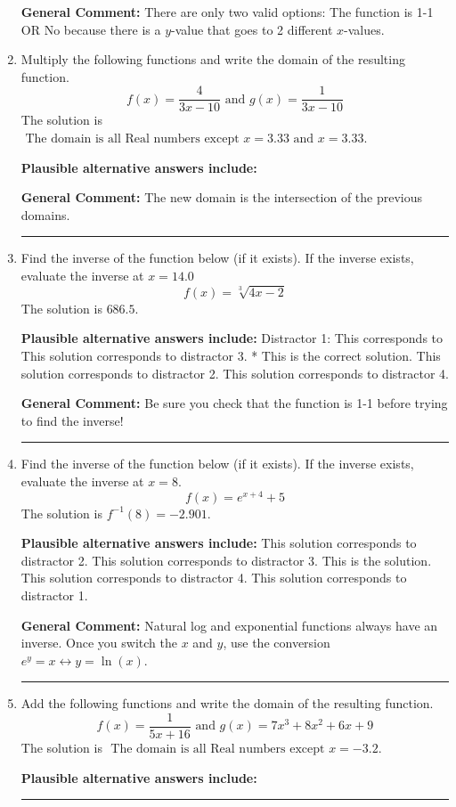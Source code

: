 \documentclass{extbook}[14pt]
\newcommand{\litem}[1]{\item #1

\rule{\textwidth}{0.4pt}}
\begin{document}
\begin{enumerate}
{\textbf{General Comment:} There are only two valid options: The function is 1-1 OR No because there is a $y$-value that goes to 2 different $x$-values.
}
\litem{
Multiply the following functions and write the domain of the resulting function.
\[ f(x) = \frac{4}{3x-10} \text{ and } g(x) = \frac{1}{3x-10} \]The solution is \( \text{ The domain is all Real numbers except } x = 3.33 \text{ and } x = 3.33 \).\begin{enumerate}[label=\Alph*.]
\textbf{Plausible alternative answers include:}




\end{enumerate}

\textbf{General Comment:} The new domain is the intersection of the previous domains.
}
\litem{
Find the inverse of the function below (if it exists). If the inverse exists, evaluate the inverse at $x = 14.0$
\[ f(x) = \sqrt[3]{4 x - 2} \]The solution is \( 686.5 \).\begin{enumerate}[label=\Alph*.]
\textbf{Plausible alternative answers include:} Distractor 1: This corresponds to 
 This solution corresponds to distractor 3.
* This is the correct solution.
 This solution corresponds to distractor 2.
 This solution corresponds to distractor 4.
\end{enumerate}

\textbf{General Comment:} Be sure you check that the function is 1-1 before trying to find the inverse!
}
\litem{
Find the inverse of the function below (if it exists). If the inverse exists, evaluate the inverse at $x = 8$.
\[ f(x) = e^{x+4}+5 \]The solution is \( f^{-1}(8) = -2.901 \).\begin{enumerate}[label=\Alph*.]
\textbf{Plausible alternative answers include:} This solution corresponds to distractor 2.
 This solution corresponds to distractor 3.
 This is the solution.
 This solution corresponds to distractor 4.
 This solution corresponds to distractor 1.
\end{enumerate}

\textbf{General Comment:} Natural log and exponential functions always have an inverse. Once you switch the $x$ and $y$, use the conversion $ e^y = x \leftrightarrow y=\ln(x)$.
}
\litem{
Add the following functions and write the domain of the resulting function.
\[ f(x) = \frac{1}{5x+16} \text{ and } g(x) = 7x^{3} +8 x^{2} +6 x + 9 \]The solution is \( \text{ The domain is all Real numbers except } x = -3.2 \).\begin{enumerate}[label=\Alph*.]
\textbf{Plausible alternative answers include:}





\end{enumerate}}
\end{enumerate}
\end{document}

